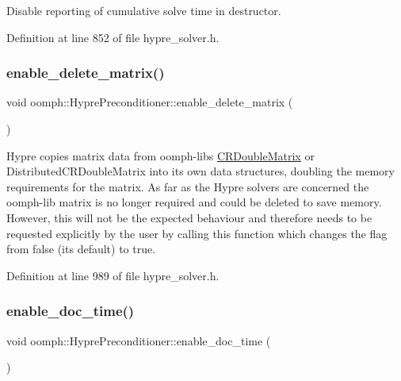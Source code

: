 Disable reporting of cumulative solve time in destructor. 



Definition at line 852 of file hypre\+\_\+solver.\+h.

\mbox{\label{classoomph_1_1HyprePreconditioner_a350716ddfca241e83904895e0d5c3f6f}} 
\subsubsection{\texorpdfstring{enable\+\_\+delete\+\_\+matrix()}{enable\_delete\_matrix()}}
{\footnotesize\ttfamily void oomph\+::\+Hypre\+Preconditioner\+::enable\+\_\+delete\+\_\+matrix (\begin{DoxyParamCaption}{ }\end{DoxyParamCaption})\hspace{0.3cm}{\ttfamily [inline]}}



Hypre copies matrix data from oomph-\/lib\textquotesingle{}s \hyperlink{classoomph_1_1CRDoubleMatrix}{C\+R\+Double\+Matrix} or Distributed\+C\+R\+Double\+Matrix into its own data structures, doubling the memory requirements for the matrix. As far as the Hypre solvers are concerned the oomph-\/lib matrix is no longer required and could be deleted to save memory. However, this will not be the expected behaviour and therefore needs to be requested explicitly by the user by calling this function which changes the flag from false (its default) to true. 



Definition at line 989 of file hypre\+\_\+solver.\+h.

\mbox{\label{classoomph_1_1HyprePreconditioner_a73e679c8139564265a8c6786a112269b}} 
\subsubsection{\texorpdfstring{enable\+\_\+doc\+\_\+time()}{enable\_doc\_time()}}
{\footnotesize\ttfamily void oomph\+::\+Hypre\+Preconditioner\+::enable\+\_\+doc\+\_\+time (\begin{DoxyParamCaption}{ }\end{DoxyParamCaption})\hspace{0.3cm}{\ttfamily [inline]}}



